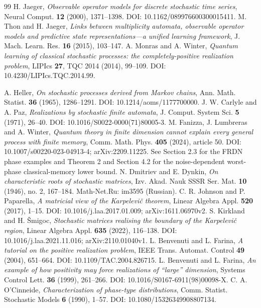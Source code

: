\begin{thebibliography}{99}
 H. Jaeger, \emph{Observable operator models for discrete stochastic time series}, Neural Comput. \textbf{12} (2000), 1371--1398. DOI: 10.1162/089976600300015411.
 M. Thon and H. Jaeger, \emph{Links between multiplicity automata, observable operator models and predictive state representations---a unified learning framework}, J. Mach. Learn. Res. \textbf{16} (2015), 103--147.
 A. Monras and A. Winter, \emph{Quantum learning of classical stochastic processes: the completely-positive realization problem}, LIPIcs \textbf{27}, TQC 2014 (2014), 99--109. DOI: 10.4230/LIPIcs.TQC.2014.99.

 A. Heller, \emph{On stochastic processes derived from Markov chains}, Ann. Math. Statist. \textbf{36} (1965), 1286--1291. DOI: 10.1214/aoms/1177700000.
 J. W. Carlyle and A. Paz, \emph{Realizations by stochastic finite automata}, J. Comput. System Sci. \textbf{5} (1971), 26--40. DOI: 10.1016/S0022-0000(71)80005-3.
 M. Fanizza, J. Lumbreras and A. Winter, \emph{Quantum theory in finite dimension cannot explain every general process with finite memory}, Comm. Math. Phys. \textbf{405} (2024), article 50. DOI: 10.1007/s00220-023-04913-4; arXiv:2209.11225. See Section 2.3 for the FRDN phase examples and Theorem 2 and Section 4.2 for the noise-dependent worst-phase classical-memory lower bound.
 N. Dmitriev and E. Dynkin, \emph{On characteristic roots of stochastic matrices}, Izv. Akad. Nauk SSSR Ser. Mat. \textbf{10} (1946), no. 2, 167--184. Math-Net.Ru: im3595 (Russian).
 C. R. Johnson and P. Paparella, \emph{A matricial view of the Karpelevi\v c theorem}, Linear Algebra Appl. \textbf{520} (2017), 1--15. DOI: 10.1016/j.laa.2017.01.009; arXiv:1611.06970v2.
 S. Kirkland and H. \v Smigoc, \emph{Stochastic matrices realising the boundary of the Karpelevi\v c region}, Linear Algebra Appl. \textbf{635} (2022), 116--138. DOI: 10.1016/j.laa.2021.11.016; arXiv:2110.01040v1.
 L. Benvenuti and L. Farina, \emph{A tutorial on the positive realization problem}, IEEE Trans. Automat. Control \textbf{49} (2004), 651--664. DOI: 10.1109/TAC.2004.826715.
 L. Benvenuti and L. Farina, \emph{An example of how positivity may force realizations of ``large'' dimension}, Systems Control Lett. \textbf{36} (1999), 261--266. DOI: 10.1016/S0167-6911(98)00098-X.
 C. A. O'Cinneide, \emph{Characterization of phase-type distributions}, Comm. Statist. Stochastic Models \textbf{6} (1990), 1--57. DOI: 10.1080/15326349908807134.

\end{thebibliography}
